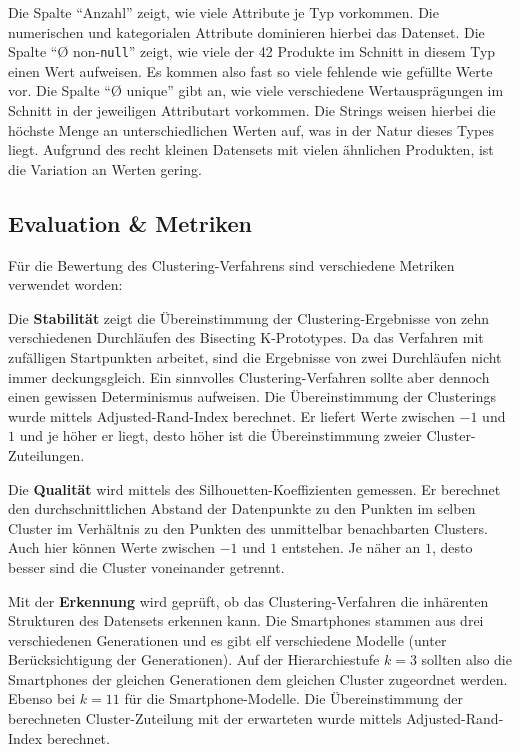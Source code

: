 Die Spalte ``Anzahl'' zeigt, wie viele Attribute je Typ vorkommen. Die
numerischen und kategorialen Attribute dominieren hierbei das Datenset.
Die Spalte ``Ø non-\texttt{null}'' zeigt, wie viele der 42 Produkte im
Schnitt in diesem Typ einen Wert aufweisen. Es kommen also fast so viele
fehlende wie gefüllte Werte vor. Die Spalte ``Ø unique'' gibt an, wie
viele verschiedene Wertausprägungen im Schnitt in der jeweiligen
Attributart vorkommen. Die Strings weisen hierbei die höchste Menge an
unterschiedlichen Werten auf, was in der Natur dieses Types liegt.
Aufgrund des recht kleinen Datensets mit vielen ähnlichen Produkten, ist
die Variation an Werten gering.

\hypertarget{evaluation-metriken}{%
\subsection{Evaluation \& Metriken}\label{evaluation-metriken}}

Für die Bewertung des Clustering-Verfahrens sind verschiedene Metriken
verwendet worden:

Die \textbf{Stabilität} zeigt die Übereinstimmung der
Clustering-Ergebnisse von zehn verschiedenen Durchläufen des Bisecting
K-Prototypes. Da das Verfahren mit zufälligen Startpunkten arbeitet,
sind die Ergebnisse von zwei Durchläufen nicht immer deckungsgleich. Ein
sinnvolles Clustering-Verfahren sollte aber dennoch einen gewissen
Determinismus aufweisen. Die Übereinstimmung der Clusterings wurde
mittels Adjusted-Rand-Index \autocite{hubert1985} berechnet. Er liefert
Werte zwischen \(-1\) und \(1\) und je höher er liegt, desto höher ist
die Übereinstimmung zweier Cluster-Zuteilungen.

Die \textbf{Qualität} wird mittels des Silhouetten-Koeffizienten
\autocite{rousseeuw1987} gemessen. Er berechnet den durchschnittlichen
Abstand der Datenpunkte zu den Punkten im selben Cluster im Verhältnis
zu den Punkten des unmittelbar benachbarten Clusters. Auch hier können
Werte zwischen \(-1\) und \(1\) entstehen. Je näher an \(1\), desto
besser sind die Cluster voneinander getrennt.

Mit der \textbf{Erkennung} wird geprüft, ob das Clustering-Verfahren die
inhärenten Strukturen des Datensets erkennen kann. Die Smartphones
stammen aus drei verschiedenen Generationen und es gibt elf verschiedene
Modelle (unter Berücksichtigung der Generationen). Auf der
Hierarchiestufe \(k=3\) sollten also die Smartphones der gleichen
Generationen dem gleichen Cluster zugeordnet werden. Ebenso bei \(k=11\)
für die Smartphone-Modelle. Die Übereinstimmung der berechneten
Cluster-Zuteilung mit der erwarteten wurde mittels Adjusted-Rand-Index
berechnet.

